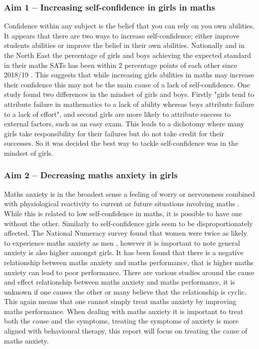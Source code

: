 \documentclass[11pt, a4paper, notitlepage]{article}
\begin{document}
\subsubsection*{Aim 1 -- Increasing self-confidence in girls in maths} 
Confidence within any subject is the belief that you can rely on you own abilities. It appears that there are two ways to increase self-confidence; either improve students abilities or improve the belief in their own abilities. Nationally and in the North East the percentage of girls and boys achieving the expected standard in their maths SATs has been within 2 percentage points of each other since 2018/19 \cite{maths_SATs_stats}. This suggests that while increasing girls abilities in maths may increase their confidence this may not be the main cause of a lack of self-confidence. One study \cite{Georgiou01122007} found two differences in the mindset of girls and boys. Firstly "girls tend to attribute failure in mathematics to a lack of ability whereas boys attribute failure to a lack of effort", and second girls are more likely to attribute success to external factors, such as an easy exam. This leads to a dichotomy where many girls take responsibility for their failures but do not take credit for their successes. So it was decided the best way to tackle self-confidence was in the mindset of girls.
\subsubsection*{Aim 2 -- Decreasing maths anxiety in girls}
Maths anxiety is in the broadest sense a feeling of worry or nervousness combined with physiological reactivity to current or future situations involving maths \cite{Luttenberger:2018}. While this is related to low self-confidence in maths, it is possible to have one without the other. Similarly to self-confidence girls seem to be disproportionately affected. The National Numeracy survey found that women were twice as likely to experience maths anxiety as men \cite{NationalNumeracy_anxiety}, however it is important to note general anxiety is also higher amongst girls. It has been found that there is a negative relationship between maths anxiety and maths performance, that is higher maths anxiety can lead to poor performance. There are various studies around the cause and effect relationship between maths anxiety and maths performance, it is unknown if one causes the other or many believe that the relationship is cyclic. This again means that one cannot simply treat maths anxiety by improving maths performance. When dealing with maths anxiety it is important to treat both the cause and the symptoms, treating the symptoms of anxiety is more aligned with behavioural therapy, this report will focus on treating the cause of maths anxiety.
\end{document}
